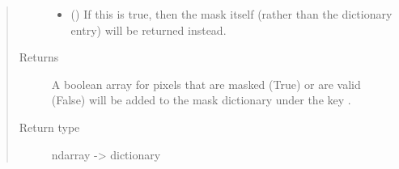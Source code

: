 \documentclass[letterpaper,10pt,english]{sphinxmanual}
\begin{document}
\begin{fulllineitems}
\begin{quote}
\begin{description}
\begin{itemize}
\item {} 
 (\sphinxstyleliteralemphasis{\sphinxupquote{ (}}\sphinxstyleliteralemphasis{\sphinxupquote{)}}) \textendash{} If this is true, then the mask itself (rather than the dictionary
entry) will be returned instead.

\end{itemize}

\item[{Returns}] \leavevmode
{} \textendash{} A boolean array for pixels that are masked (True) or are valid
(False) will be added to the mask dictionary under the
key .

\item[{Return type}] \leavevmode
ndarray -\textgreater{} dictionary

\end{description}\end{quote}

\end{fulllineitems}

\end{document}
